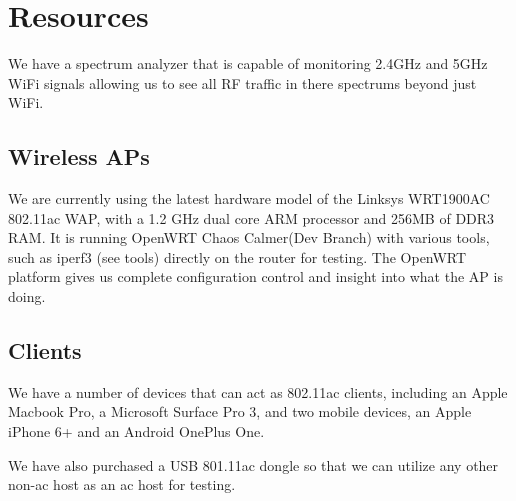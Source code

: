 \section{Resources}

We have a spectrum analyzer that is capable of monitoring 2.4GHz and 5GHz WiFi signals 
allowing us to see all RF traffic in there spectrums beyond just WiFi.

\subsection{Wireless APs}

We are currently using the latest hardware model of the Linksys WRT1900AC 802.11ac WAP, with a 1.2 GHz dual core ARM
processor and 256MB of DDR3 RAM. It is running OpenWRT Chaos Calmer(Dev Branch) with various tools, such as iperf3 (see tools) 
directly on the router for testing. The OpenWRT platform gives us complete configuration control
and insight into what the AP is doing.

\subsection{Clients}

We have a number of devices that can act as
802.11ac clients, including an Apple Macbook Pro, a Microsoft Surface Pro 3,
and two mobile devices, an Apple iPhone 6+ and an Android OnePlus
One.

We have also purchased a USB 801.11ac dongle so that we can utilize any other
non-ac host as an ac host for testing.

